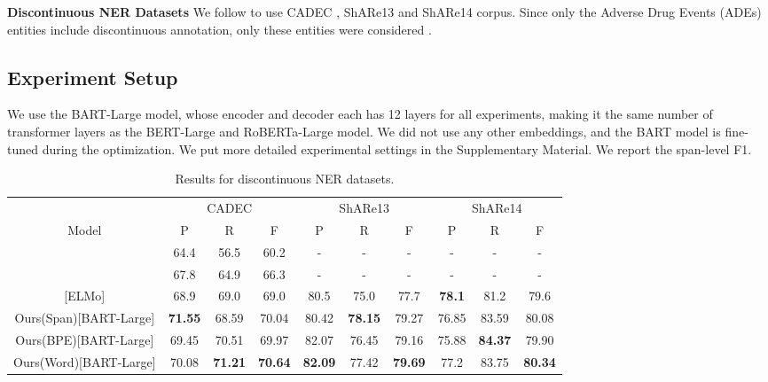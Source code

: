 \documentclass[11pt,a4paper]{article}
\begin{document}
\textbf{Discontinuous NER Datasets} We follow \citet{DBLP:conf/acl/DaiKHP20} to use CADEC \citep{DBLP:journals/jbi/KarimiMKW15}, ShARe13 \citep{DBLP:conf/clef/PradhanESMCVSCS13} and ShARe14 \citep{DBLP:conf/clef/MoweryVSCMKGEPSC14} corpus. Since only the Adverse Drug Events (ADEs) entities include discontinuous annotation, only these entities were considered \citep{DBLP:conf/acl/DaiKHP20,DBLP:conf/semweb/Metke-JimenezK16,DBLP:journals/wicomm/TangHWC18}.

\subsection{Experiment Setup}
We use the BART-Large model, whose encoder and decoder each has 12 layers for all experiments, making it the same number of transformer layers as the BERT-Large and RoBERTa-Large model. We did not use any other embeddings, and the BART model is fine-tuned during the optimization.  We put more detailed experimental settings in the Supplementary Material. We report the span-level F1.


\begin{table*}[!htb]
  \centering
  \setlength{\tabcolsep}{2pt}  \begin{tabular}{c|ccc|ccc|ccc}
\toprule
  & \multicolumn{3}{c|}{CADEC} & \multicolumn{3}{c|}{ShARe13} & \multicolumn{3}{c}{ShARe14} \\
  Model & P       & R      & F      & P        & R       & F       & P        & R       & F       \\
\midrule
  \citet{DBLP:conf/semweb/Metke-JimenezK16} & 64.4    & 56.5   & 60.2   & -        & -       & -       & -        & -       & -       \\
  \citet{DBLP:journals/wicomm/TangHWC18}    & 67.8    & 64.9   & 66.3   & -        & -       & -       & -        & -       & -       \\
  \citet{DBLP:conf/acl/DaiKHP20}[ELMo]     & 68.9    & 69.0   & 69.0   & 80.5     & 75.0    & 77.7    & \textbf{78.1}     & 81.2    & 79.6    \\
\midrule
  Ours(Span)[BART-Large]    & \textbf{71.55}  & 68.59 & 70.04  & 80.42    & \textbf{78.15}   & 79.27   & 76.85    & 83.59   & 80.08   \\
  Ours(BPE)[BART-Large]  & 69.45   & 70.51  & 69.97  & 82.07    & 76.45   & 79.16   & 75.88    & \textbf{84.37}   & 79.90   \\
  Ours(Word)[BART-Large] & 70.08   & \textbf{71.21}  & \textbf{70.64}  & \textbf{82.09}    & 77.42   & \textbf{79.69}   & 77.2     & 83.75   & \textbf{80.34}  \\
\bottomrule
  \end{tabular}
  \caption{Results for discontinuous NER datasets. }
  \label{tb:dis_ner}
\end{table*}
\end{document}
